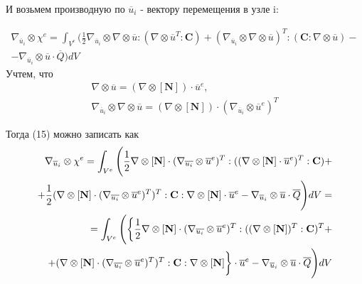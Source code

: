 \documentclass[a4paper,12pt]{article}
\begin{document}
И возьмем производную по $\overline{u}_i$ - вектору перемещения в узле i:

 
\begin{align}
\nabla_{\overline{u}_i} \otimes \chi^e = \int_{V^e} \Bigg(\frac{1}{2} \nabla_{\overline{u}_i} \otimes  \nabla \otimes \overline{u} : (\nabla \otimes \overline{u}^T:\textbf{C}) + (\nabla_{\overline{u}_i} \otimes  \nabla \otimes \overline{u})^T : (\textbf{C}:\nabla \otimes \overline{u})  - \\ - \nabla_{\overline{u}_i} \otimes\overline{u} \cdot \overline{Q}\Bigg) dV
\end{align}
Учтем, что 
\begin{equation}
\begin{split}
    \nabla \otimes \overline{u} = (\nabla \otimes [\textbf{N}]) \cdot \overline{u}^e, \\
    \nabla_{\overline{u}_i} \otimes \nabla \otimes \overline{u}  = (\nabla \otimes [\textbf{N}]) \cdot (\nabla_{\overline{u}_i} \otimes \overline{u}^e)^T
\end{split}
\end{equation}

Тогда (15) можно записать как
\begin{equation}
    \begin{split}
        \nabla_{\overline{u}_i} \otimes \chi^e   =  \int_{V^e} \Bigg(\frac{1}{2} \nabla \otimes [\textbf{N}] \cdot (\nabla_{\overline{u_i}} \otimes \overline{u}^e)^T:((\nabla \otimes[\textbf{N}] \cdot \overline{u}^e)^T :\textbf{C}) + \\
        + \frac{1}{2} (\nabla \otimes [\textbf{N}] \cdot (\nabla_{\overline{u_i}} \otimes \overline{u}^e)^T)^T:\textbf{C}:\nabla \otimes [\textbf{N}] \cdot \overline{u}^e - \nabla_{\overline{u}_i} \otimes\overline{u} \cdot \overline{Q}\Bigg) \space dV = \\
        =\int_{V^e} \Bigg( \bigg\{  \frac{1}{2}\nabla \otimes [\textbf{N}] \cdot (\nabla_{\overline{u_i}} \otimes \overline{u}^e)^T:((\nabla \otimes[\textbf{N}])^T:\textbf{C})^T + \\ 
        +(\nabla \otimes [\textbf{N}] \cdot (\nabla_{\overline{u_i}} \otimes \overline{u}^e)^T)^T:\textbf{C}:\nabla \otimes [\textbf{N}] \bigg\} \cdot   \overline{u}^e  - \nabla_{\overline{u}_i} \otimes\overline{u} \cdot \overline{Q} \Bigg)dV
    \end{split}
\end{equation}
\end{document}
